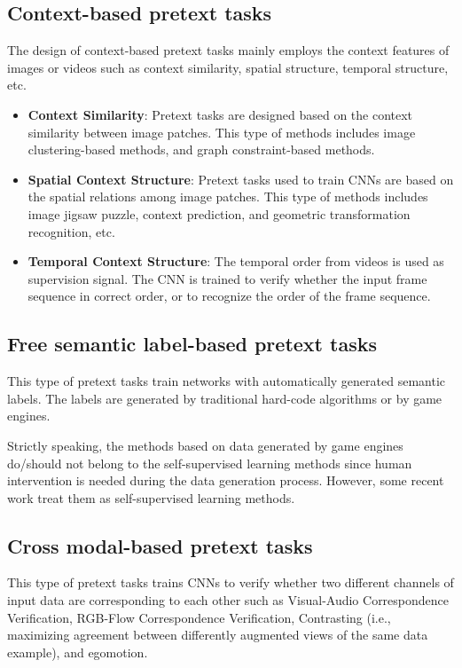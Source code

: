 \subsection{Context-based pretext tasks}
The design of context-based pretext tasks mainly employs the context features of
images or videos such as context similarity, spatial structure, temporal structure, etc.
\begin{itemize}
      \item \textbf{Context Similarity}: Pretext tasks are designed based on the
            context similarity between image patches. This type of methods includes
            image clustering-based methods, and graph constraint-based methods.
      \item \textbf{Spatial Context Structure}: Pretext tasks used to train CNNs are
            based on the spatial relations among image patches. This type of methods
            includes image jigsaw puzzle, context prediction, and geometric
            transformation recognition, etc.
      \item \textbf{Temporal Context Structure}: The temporal order from videos is
            used as supervision signal. The CNN is trained to verify whether the
            input frame sequence in correct order, or to recognize the order of the
            frame sequence.
\end{itemize}

\subsection{Free semantic label-based pretext tasks}
This type of pretext tasks train networks with automatically generated semantic
labels. The labels are generated by traditional hard-code algorithms or by game
engines.

\begin{note}
      Strictly speaking, the methods based on data generated by game engines
      do/should not belong to the self-supervised learning methods since human
      intervention is needed during the data generation process. However, some
      recent work treat them as self-supervised learning methods.
\end{note}

\subsection{Cross modal-based pretext tasks}
This type of pretext tasks trains CNNs to verify whether two different channels
of input data are corresponding to each other such as Visual-Audio Correspondence
Verification, RGB-Flow Correspondence Verification, Contrasting (i.e., maximizing
agreement between differently augmented views of the same data example), and egomotion.

